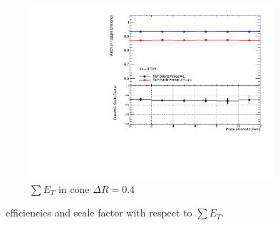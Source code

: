 \begin{figure}[phtb]
    \begin{subfigure}[b]{0.55\textwidth}
      \includegraphics[width=\textwidth]{PartCalibration2012/Plots/SFPlots/etcone40_smt.pdf}
      \caption{$\sum E_{T}$ in cone $\Delta R=0.4$}\label{fig:CalibrationIsoEtcone40}
    \end{subfigure}
  \caption{\xsd\ efficiencies and scale factor with respect to $\sum E_{T}$.} \label{fig:CalibrationIsoEtcone}
\end{figure}

